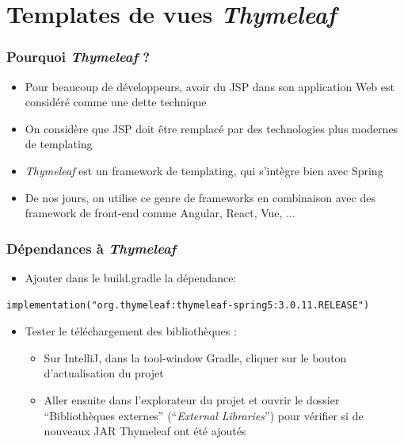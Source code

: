 \documentclass{beamer}
\begin{document}
\section{Templates de vues \textit{Thymeleaf}}

\begin{frame}
	\frametitle{Pourquoi \textit{Thymeleaf} ?}
	\begin{itemize}
		\item Pour beaucoup de développeurs, avoir du JSP dans son application Web est considéré comme une dette technique
		\item On considère que JSP doit être remplacé par des technologies plus modernes de templating
		\item \textit{Thymeleaf} est un framework de templating, qui s'intègre bien avec Spring
		\item De nos jours, on utilise ce genre de frameworks en combinaison avec des framework de front-end comme Angular, React, Vue, ...
	\end{itemize}
\end{frame} 

\begin{frame}[fragile]
	\frametitle{Dépendances à \textit{Thymeleaf}}
	\begin{itemize}
		\item Ajouter dans le build.gradle la dépendance:
	\end{itemize}		
\begin{lstlisting}
implementation("org.thymeleaf:thymeleaf-spring5:3.0.11.RELEASE")
\end{lstlisting}
	\begin{itemize}
		\item Tester le téléchargement des bibliothèques :
		\begin{itemize}
			\item Sur IntelliJ, dans la tool-window Gradle, cliquer sur le bouton d'actualisation du projet 
			\item Aller ensuite dans l'explorateur du projet et ouvrir le dossier ``Bibliothèques externes'' (``\textit{External Libraries}'') pour vérifier si de nouveaux JAR Thymeleaf ont été ajoutés
		\end{itemize} 
	\end{itemize}
\end{frame}
\end{document}

